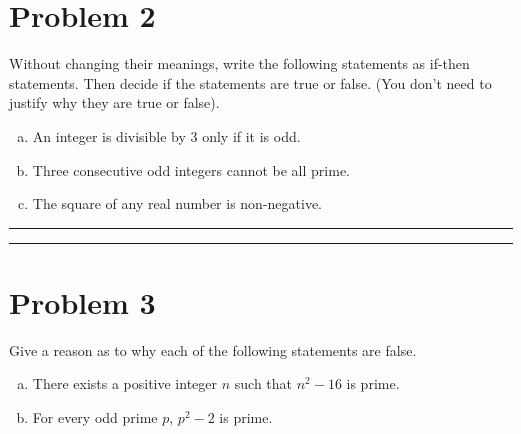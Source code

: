 \documentclass{article}
\theoremstyle{definition}
\newenvironment{solution}{\bigskip\hrule{\hfill}}{\bigskip\hrule{\hfill}} %
\begin{document}
\section*{Problem 2}

Without changing their meanings, write the following statements as if-then statements. Then decide if the statements are true or false. (You don't need to justify why they are true or false).

\begin{enumerate}[a)] %
    \item An integer is divisible by $3$ only if it is odd.

    \item Three consecutive odd integers cannot be all prime.

    \item The square of any real number is non-negative.
\end{enumerate}

\begin{solution}


\end{solution}


\newpage


\section*{Problem 3}

Give a reason as to why each of the following statements are false.

\begin{enumerate}[a)] %
    \item There exists a positive integer $n$ such that $n^2-16$ is prime.
    
    \item For every odd prime $p$, $p^2-2$ is prime.
\end{enumerate}
\end{document}
